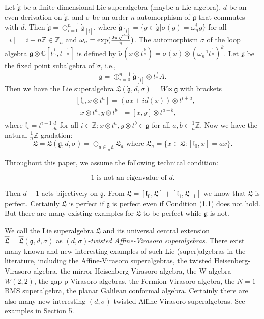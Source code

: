 \documentclass[1p]{elsarticle}
\numberwithin{equation}{section}
\def\dg{\dot{\mathfrak{g}}}
\def\fg{\mathfrak{g}}
\def\fL{\mathfrak{L}}
\def\bC{\mathbb{C}}
\def\bZ{\mathbb{Z}}
\def\fl{\mathfrak{l}}
\def\hL{\hat{\fL}}
\begin{document}
Let $\dg$ be a finite dimensional Lie superalgebra (maybe a Lie algebra), $d$ be an even derivation on $\dg$, and $\sigma$ be an order $n$ automorphism of $\dg$ that commutes with $d$. Then $\dg=\oplus_{i=0}^{n-1}  \dg_{[i]}$, where $\dg_{[i]}=\{g\in \dg|\sigma(g)=\omega_n^i g\}$ for all $[i]=i+n\bZ\in \bZ_n$ and $\omega_n={\rm exp}(\frac{2\pi \sqrt{-1}}{n})$. The automorphism $\tilde{\sigma}$ of the loop algebra $\dg\otimes \bC[t^{\frac 1n},t^{-\frac 1n}]$ is defined by $\tilde{\sigma}(x\otimes t^{\frac kn})=\sigma(x)\otimes (\omega_n^{-1}t^{\frac 1n})^k$.  Let $\fg$ be the fixed point subalgebra of $\tilde{\sigma}$, i.e.,  $$\fg=\oplus_{i=0}^{n-1}\dg_{[i]}\otimes t^{\frac in}A.$$ Then we have the Lie superalgebra $\fL(\dg,d,\sigma)= W\ltimes\fg$ with brackets
\begin{align*}
&[\fl_i,x\otimes t^a]=(ax+id(x))\otimes t^{i+a},\\
&[x\otimes t^a, y\otimes t^b]=[x,y]\otimes t^{a+b},
\end{align*}
where $\fl_i=t^{i+1}\frac{d}{d t}$ for all $i\in \bZ; x\otimes t^a,y\otimes t^b\in \fg$ for all $a,b\in \frac 1n \bZ$. Now we have the natural  $\frac 1n \bZ$-gradation: $$\fL=\fL(\dg,d,\sigma)=\oplus_{a\in \frac 1n \bZ}\fL_a\text{ where }\fL_a=\{x\in \fL:[\fl_0,x]=ax\}.$$

 Throughout this paper, we assume the following technical condition:

 \begin{equation}1 \mbox{ is not an eigenvalue of}\,\, d.\end{equation}

\noindent Then $d-1$ acts bijectively on $\dg$. From $\fL=[\fl_0,\fL]+[\fl_1,\fL_{-1}]$ we know that $\fL$ is perfect.  Certainly $\fL$  is perfect if $\dg$ is perfect even if Condition (1.1) does not hold. But there are many existing  examples for $\fL$ to be perfect while $\dg$ is not.

We call the Lie superalgebra  $\fL$ and its   universal central extension  $\hL=\hL(\dg,d,\sigma)$   as $(d,\sigma)$-\emph{twisted Affine-Virasoro superalgebras}. There exist many known and new interesting examples of such Lie (super)algebras in the literature, including the    Affine-Virasoro superalgebras,  the twisted Heisenberg-Virasoro algebra, the mirror Heisenberg-Virasoro algebra, the W-algebra $W(2,2)$,   the gap-p Virasoro algebras, the Fermion-Virasoro algebra, the $N=1$ BMS superalgebra, the  planar Galilean conformal algebra. Certainly there are also many new interesting $(d,\sigma)$-twisted Affine-Virasoro superalgebras.
 See examples in Section 5.
\end{document}
